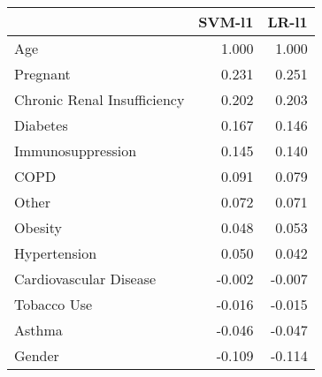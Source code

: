 \begin{tabular}{lrr}
\toprule
{} &  SVM-l1 &  LR-l1 \\
\midrule
Age                         &   1.000 &  1.000 \\
Pregnant                    &   0.231 &  0.251 \\
Chronic Renal Insufficiency &   0.202 &  0.203 \\
Diabetes                    &   0.167 &  0.146 \\
Immunosuppression           &   0.145 &  0.140 \\
COPD                        &   0.091 &  0.079 \\
Other                       &   0.072 &  0.071 \\
Obesity                     &   0.048 &  0.053 \\
Hypertension                &   0.050 &  0.042 \\
Cardiovascular Disease      &  -0.002 & -0.007 \\
Tobacco Use                 &  -0.016 & -0.015 \\
Asthma                      &  -0.046 & -0.047 \\
Gender                      &  -0.109 & -0.114 \\
\bottomrule
\end{tabular}
